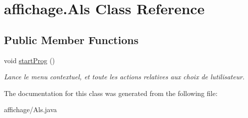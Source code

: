 \hypertarget{classaffichage_1_1_als}{}\section{affichage.\+Als Class Reference}
\label{classaffichage_1_1_als}
\subsection*{Public Member Functions}
\begin{DoxyCompactItemize}
\item 
void \hyperlink{classaffichage_1_1_als_a31c2063eab5cb1b14270f2abfc86b998}{start\+Prog} ()\hypertarget{classaffichage_1_1_als_a31c2063eab5cb1b14270f2abfc86b998}{}\label{classaffichage_1_1_als_a31c2063eab5cb1b14270f2abfc86b998}

\begin{DoxyCompactList}\small\item\em Lance le menu contextuel, et toute les actions relatives aux choix de l\textquotesingle{}utilisateur. \end{DoxyCompactList}\end{DoxyCompactItemize}


The documentation for this class was generated from the following file\+:\begin{DoxyCompactItemize}
\item 
affichage/Als.\+java\end{DoxyCompactItemize}
